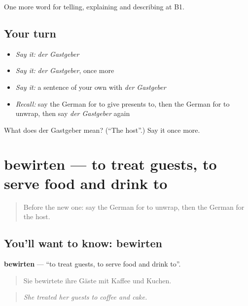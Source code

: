\begin{grammarlens}[title={What you've built}]
One more word for telling, explaining and describing at B1.
\end{grammarlens}

\subsection*{Your turn}
\begin{itemize}
\raggedright
  \item \emph{Say it:} \emph{der Gastgeber}
  \item \emph{Say it:} \emph{der Gastgeber}, once more
  \item \emph{Say it:} a sentence of your own with \emph{der Gastgeber}
  \item \emph{Recall:} say the German for to give presents to, then the German for to unwrap, then say \emph{der Gastgeber} again
\end{itemize}

\begin{tcolorbox}[breakable,colback=teal!4,colframe=teal!35!black,title={Before you move on}]
What does der Gastgeber mean? (\textquotedblleft{}The host\textquotedblright{}.) Say it once more.
\end{tcolorbox}
\section[bewirten]{bewirten — to treat guests, to serve food and drink to}

\label{lesson:GE-C307-bewirten}



\begin{quote}
Before the new one: say the German for to unwrap, then the German for the host.
\end{quote}

\subsection*{You'll want to know: bewirten}
\textbf{bewirten} — \textquotedblleft{}to treat guests, to serve food and drink to\textquotedblright{}.

\begin{quote}
Sie bewirtete ihre Gäste mit Kaffee und Kuchen.
\end{quote}

\begin{quote}
\emph{She treated her guests to coffee and cake.}
\end{quote}

